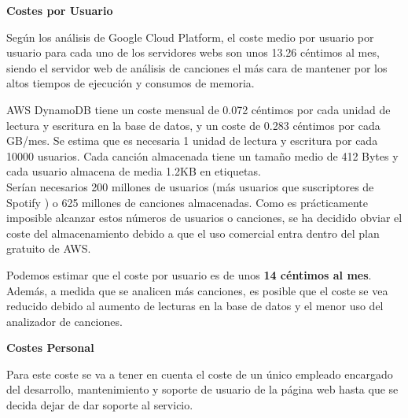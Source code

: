 \begin{table}[H]
    \label{A:tab:fijos}
    \caption{Costes Fijos}
\end{table}

\textbf{Costes por Usuario}

Según los análisis de Google Cloud Platform, el coste medio por usuario por usuario para cada uno de los servidores webs son unos 13.26 céntimos al mes, siendo el servidor web de análisis de canciones el más cara de mantener por los altos tiempos de ejecución y consumos de memoria. 

AWS DynamoDB tiene un coste mensual de 0.072 céntimos por cada unidad de lectura y escritura en la base de datos, y un coste de 0.283 céntimos por cada GB/mes. Se estima que es necesaria 1 unidad de lectura y escritura por cada 10000 usuarios. Cada canción almacenada tiene un tamaño medio de 412 Bytes y cada usuario almacena de media 1.2KB en etiquetas. \\
Serían necesarios 200 millones de usuarios (más usuarios que suscriptores de Spotify \cite{A:spot_subs}) o 625 millones de canciones almacenadas. Como es prácticamente imposible alcanzar estos números de usuarios o canciones, se ha decidido obviar el coste del almacenamiento debido a que el uso comercial entra dentro del plan gratuito de AWS. 

Podemos estimar que el coste por usuario es de unos \textbf{14 céntimos al mes}. Además, a medida que se analicen más canciones, es posible que el coste se vea reducido debido al aumento de lecturas en la base de datos y el menor uso del analizador de canciones. 

\textbf{Costes Personal}

Para este coste se va a tener en cuenta el coste de un único empleado encargado del desarrollo, mantenimiento y soporte de usuario de la página web hasta que se decida dejar de dar soporte al servicio. 

